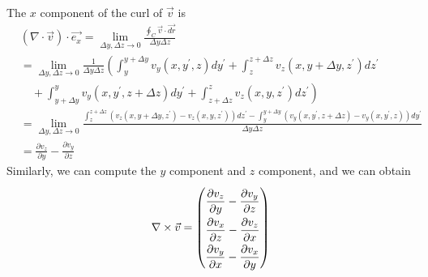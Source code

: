\documentclass[letterpaper, 12pt]{article}
\theoremstyle{custom}
\begin{document}
The $x$ component of the curl of $\vec{v}$ is
\begin{align*}
  &\left( \nabla \cdot \vec{v} \right) \cdot \vec{e_x}
  = \lim_{\Delta y, \Delta z \rightarrow 0} \frac{\displaystyle \oint_C \vec{v} \cdot \vec{dr}}{\Delta y \Delta z} \\
  &= \lim_{\Delta y, \Delta z \rightarrow 0} \frac{1}{\Delta y \Delta z} \left( 
    \int_{y}^{y+\Delta y} v_y(x, y^{\prime}, z)dy^{\prime} +\int_{z}^{z+\Delta z} v_z(x, y+\Delta y, z^{\prime})dz^{\prime}  \right. \\
  &\quad + \left. \int_{y+\Delta y}^{y} v_y(x, y^{\prime}, z+\Delta z)dy^{\prime}+ \int_{z+\Delta z}^{z} v_z(x, y, z^{\prime})dz^{\prime}
  \right)\\
  &= \lim_{\Delta y, \Delta z \rightarrow 0} \frac{\int_{z}^{z+\Delta z} (v_z(x, y+\Delta y, z^{\prime}) - v_z(x, y, z^{\prime})) dz^{\prime} - 
  \int_{y}^{y+\Delta y} (v_y(x, y^{\prime}, z+\Delta z) - v_y(x, y^{\prime}, z)) dy^{\prime}}{\Delta y \Delta z}\\
  &= \frac{\partial v_z}{\partial y} - \frac{\partial v_y}{\partial z}
\end{align*}
Similarly, we can compute the $y$ component and $z$ component, and we can obtain
\begin{equation*}
  \nabla \times \vec{v} = \renewcommand{\arraystretch}{2}
  \begin{pmatrix}
      \displaystyle \frac{\partial v_z}{\partial y} - \frac{\partial v_y}{\partial z} \\
      \displaystyle \frac{\partial v_x}{\partial z} - \frac{\partial v_z}{\partial x} \\
      \displaystyle \frac{\partial v_y}{\partial x} - \frac{\partial v_x}{\partial y}
    \end{pmatrix}
\end{equation*}
\end{document}
